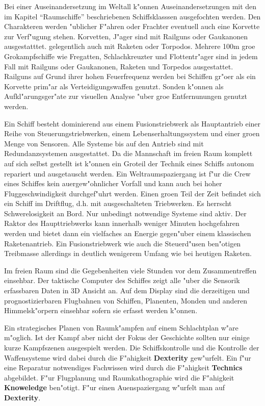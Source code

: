 Bei einer Auseinandersetzung im Weltall k"onnen Auseinandersetzungen mit den im Kapitel "`Raumschiffe"' beschriebenen Schiffsklasssen ausgefochten werden. Den Charakteren werden "ublicher F"ahren oder Frachter eventuell auch eine Korvette zur Verf"ugung stehen. Korvetten, J"ager sind mit Railguns oder Gau\3kanonen ausgestatttet. gelegentlich auch mit Raketen oder Torpodos. Mehrere 100m gro\3e Gro\3kampfschiffe wie Fregatten, Schlachkreuzter und Flottentr"ager sind in jedem Fall mit Railguns oder Gau\3kanonen, Raketen und Torpedos ausgestattet. Railguns auf Grund ihrer hohen Feuerfrequenz werden bei Schiffen gr"o\3er als ein Korvette prim"ar als Verteidigungswaffen genutzt. Sonden k"onnen als Aufkl"arungsger"ate zur visuellen Analyse "uber gro\3e Entfernunungen genutzt werden.

Ein Schiff besteht dominierend aus einem Fusionstriebwerk als Hauptantrieb einer Reihe von Steuerungstriebwerken, einem Lebenserhaltungssystem und einer gro\3en Menge von Sensoren. Alle Systeme bis auf den Antrieb sind mit Redundanzsystemen ausgestattet. Da die Mannschaft im freien Raum komplett auf sich selbst gestellt ist k"onnen ein Gro\3teil der Technik eines Schiffs autonom repariert und ausgetauscht werden. Ein Weltraumspaziergang ist f"ur die Crew eines Schiffes kein au\3ergew"ohnlicher Vorfall und kann auch bei hoher Fluggeschwindigkeit durchgef"uhrt werden. Einen gro\3en Teil der Zeit befindet sich ein Schiff im Driftflug, d.h. mit ausgeschalteten Triebwerken. Es herrscht Schwerelosigkeit an Bord. Nur unbedingt notwendige Systeme sind aktiv. Der Raktor des Haupttriebwerks kann innerhalb weniger Minuten hochgefahren werden und bietet dann ein vielfaches an Energie gegen"uber einem klassischen Raketenantrieb. Ein Fusionstriebwerk wie auch die Steuerd"usen ben"otigen Treibmasse allerdings in deutlich wenigerem Umfang wie bei heutigen Raketen.

Im freien Raum sind die Gegebenheiten viele Stunden vor dem Zusammentreffen einsehbar. Der taktische Computer des Schiffes zeigt alle "uber die Sensorik erfassbaren Daten in 3D Ansicht an. Auf dem Display sind die derzeitigen und prognostizierbaren Flugbahnen von Schiffen, Planenten, Monden und anderen Himmelsk"orpern einsehbar sofern sie erfasst werden k"onnen.

Ein strategisches Planen von Raumk"ampfen auf einem Schlachtplan w"are m"oglich. Ist der Kampf aber nicht der Fokus der Geschichte sollten nur einige kurze Kampfszenen ausgespielt werden. Die Schiffskontrolle und die Kontrolle der Waffensysteme wird dabei durch die F"ahigkeit \textbf{Dexterity} gew"urfelt. Ein f"ur eine Reparatur notwendiges Fachwissen wird durch die F"ahigkeit \textbf{Technics} abgebildet. F"ur Flugplanung und Raumkathographie wird die F"ahigkeit \textbf{Knoweledge} ben"otigt. F"ur einen Au\3enspaziergang w"urfelt man auf \textbf{Dexterity}.

